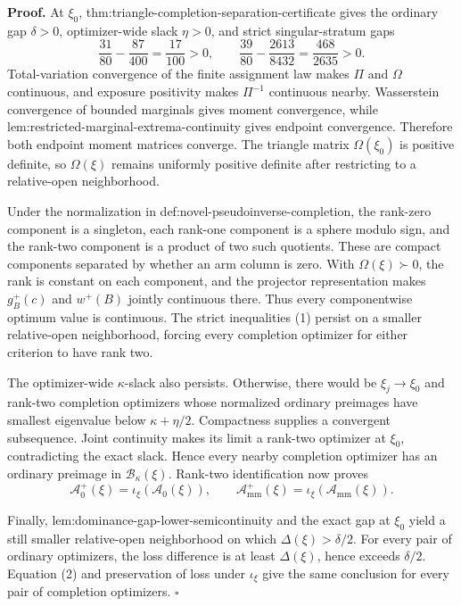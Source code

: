 \textbf{Proof.}
At \(\xi_0\), thm:triangle-completion-separation-certificate gives the ordinary gap \(\delta>0\), optimizer-wide slack \(\eta>0\), and strict singular-stratum gaps
\[
\frac{31}{80}-\frac{87}{400}=\frac{17}{100}>0,
\qquad
\frac{39}{80}-\frac{2613}{8432}=\frac{468}{2635}>0. \tag{1}
\]
Total-variation convergence of the finite assignment law makes \(\Pi\) and \(\Omega\) continuous, and exposure positivity makes \(\Pi^{-1}\) continuous nearby.  Wasserstein convergence of bounded marginals gives moment convergence, while lem:restricted-marginal-extrema-continuity gives endpoint convergence.  Therefore both endpoint moment matrices converge.  The triangle matrix \(\Omega(\xi_0)\) is positive definite, so \(\Omega(\xi)\) remains uniformly positive definite after restricting to a relative-open neighborhood.

Under the normalization in def:novel-pseudoinverse-completion, the rank-zero component is a singleton, each rank-one component is a sphere modulo sign, and the rank-two component is a product of two such quotients.  These are compact components separated by whether an arm column is zero.  With \(\Omega(\xi)\succ0\), the rank is constant on each component, and the projector representation makes \(g_B^+(c)\) and \(w^+(B)\) jointly continuous there.  Thus every componentwise optimum value is continuous.  The strict inequalities (1) persist on a smaller relative-open neighborhood, forcing every completion optimizer for either criterion to have rank two.

The optimizer-wide \(\kappa\)-slack also persists.  Otherwise, there would be \(\xi_j\to\xi_0\) and rank-two completion optimizers whose normalized ordinary preimages have smallest eigenvalue below \(\kappa+\eta/2\).  Compactness supplies a convergent subsequence.  Joint continuity makes its limit a rank-two optimizer at \(\xi_0\), contradicting the exact slack.  Hence every nearby completion optimizer has an ordinary preimage in \(\mathcal B_\kappa(\xi)\).  Rank-two identification now proves
\[
\mathcal A_0^+(\xi)=\iota_\xi(\mathcal A_0(\xi)),
\qquad
\mathcal A_{\mathrm{mm}}^+(\xi)=\iota_\xi(\mathcal A_{\mathrm{mm}}(\xi)). \tag{2}
\]

Finally, lem:dominance-gap-lower-semicontinuity and the exact gap at \(\xi_0\) yield a still smaller relative-open neighborhood on which \(\Delta(\xi)>\delta/2\).  For every pair of ordinary optimizers, the loss difference is at least \(\Delta(\xi)\), hence exceeds \(\delta/2\).  Equation (2) and preservation of loss under \(\iota_\xi\) give the same conclusion for every pair of completion optimizers. \(\square\)
